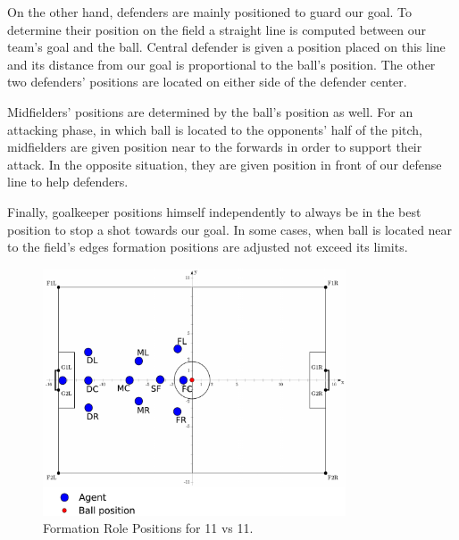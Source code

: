 On the other hand, defenders are mainly positioned to guard our goal. To determine their position on the field a straight line is computed between our team's goal and the ball. Central defender is given a position placed on this line and its distance from our goal is proportional to the ball's position. The other two defenders' positions are located on either side of the defender center. 

Midfielders' positions are determined by the ball's position as well. For an attacking phase, in which ball is located to the opponents' half of the pitch, midfielders are given position near to the forwards in order to support their attack. In the opposite situation, they are given position in front of our defense line to help defenders. 

Finally, goalkeeper positions himself independently to always be in the best position to stop a shot towards our goal. In some cases, when ball is located near to the field's edges formation positions are adjusted not exceed its limits.

\begin{figure}[t!]
\centering
  \includegraphics[width=0.8\textwidth]{Chapter4/figures/Formation11_0.pdf}
  \caption{Formation Role Positions for 11 vs 11.} 
  \label{fig:Formation11_0}
\end{figure}



